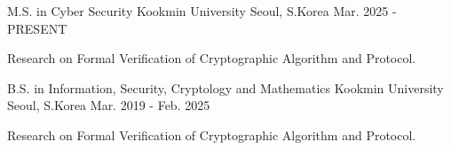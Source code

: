


\begin{cventries}



\cventry
{M.S. in Cyber Security} %
{Kookmin University} %
{Seoul, S.Korea} %
{Mar. 2025 - PRESENT} %
{ %
	\begin{cvitems}
		\item {Research on Formal Verification of Cryptographic Algorithm and Protocol.}
	\end{cvitems}
}

\cventry
{B.S. in Information, Security, Cryptology and Mathematics} %
{Kookmin University} %
{Seoul, S.Korea} %
{Mar. 2019 - Feb. 2025} %
{ %
	\begin{cvitems}
		\item {Research on Formal Verification of Cryptographic Algorithm and Protocol.}
	\end{cvitems}
}



\end{cventries}